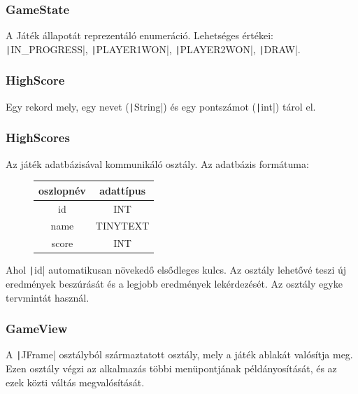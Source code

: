 \documentclass[a4paper,12pt]{article}
\begin{document}
	\subsubsection{GameState}
	A Játék állapotát reprezentáló enumeráció. Lehetséges értékei: \texttt|IN_PROGRESS|, \texttt|PLAYER1WON|, \texttt|PLAYER2WON|, \texttt|DRAW|.
	\subsubsection{HighScore}
	Egy rekord mely, egy nevet (\texttt|String|) és egy pontszámot (\texttt|int|) tárol el.
	\subsubsection{HighScores}
	Az játék adatbázisával kommunikáló osztály. Az adatbázis formátuma:
	\begin{figure}[H]
		\centering
		\begin{tabular}{|c|c|}
			\hline
			oszlopnév & adattípus  \\
			\hline
			id & INT  \\
			\hline
			name & TINYTEXT \\
			\hline
			score & INT\\
			\hline
		\end{tabular}
	\end{figure} \noindent
	Ahol \texttt|id| automatikusan növekedő elsődleges kulcs. Az osztály lehetővé teszi új eredmények beszúrását és a legjobb eredmények lekérdezését. Az osztály egyke tervmintát használ.
	\subsubsection{GameView}
	A \texttt|JFrame| osztályból származtatott osztály, mely a játék ablakát valósítja meg. Ezen osztály végzi az alkalmazás többi menüpontjának példányosítását, és az ezek közti váltás megvalósítását. 
\end{document}
